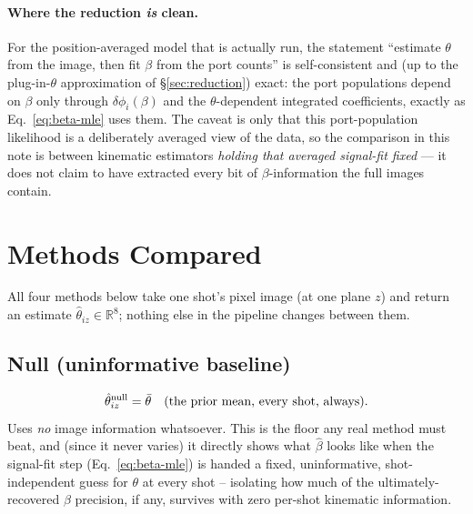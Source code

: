 \documentclass[11pt,a4paper]{article}
\newcommand{\R}{\mathbb{R}}
\begin{document}
\paragraph{Where the reduction \emph{is} clean.} For the position-averaged
model that is actually run, the statement ``estimate $\theta$ from the image,
then fit $\beta$ from the port counts'' is self-consistent and (up to the
plug-in-$\theta$ approximation of \S\ref{sec:reduction}) exact: the port
populations depend on $\beta$ only through $\delta\phi_i(\beta)$ and the
$\theta$-dependent integrated coefficients, exactly as Eq.~\ref{eq:beta-mle}
uses them. The caveat is only that this port-population likelihood is a
deliberately averaged view of the data, so the comparison in this note is
between kinematic estimators \emph{holding that averaged signal-fit fixed} ---
it does not claim to have extracted every bit of $\beta$-information the full
images contain.

\section{Methods Compared}
\label{sec:methods}

All four methods below take one shot's pixel image (at one plane $z$) and
return an estimate $\hat\theta_{iz}\in\R^8$; nothing else in the pipeline
changes between them.

\subsection{Null (uninformative baseline)}
\[
  \hat\theta_{iz}^{\rm null} = \bar\theta \quad\text{(the prior mean, every shot, always)}.
\]
Uses \emph{no} image information whatsoever. This is the floor any real
method must beat, and (since it never varies) it directly shows what
$\hat\beta$ looks like when the signal-fit step (Eq.~\ref{eq:beta-mle}) is
handed a fixed, uninformative, shot-independent guess for $\theta$ at every
shot -- isolating how much of the ultimately-recovered $\beta$ precision, if
any, survives with zero per-shot kinematic information.
\end{document}
